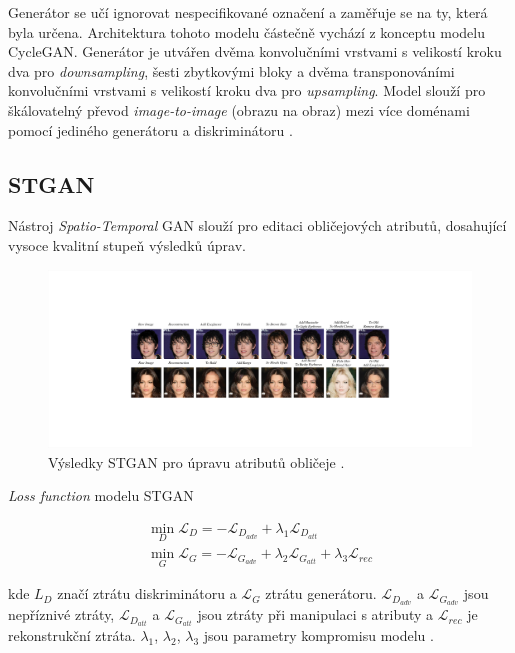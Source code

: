 \bigskip

\noindent Generátor se učí ignorovat nespecifikované označení a zaměřuje se na ty, která byla určena. Architektura tohoto modelu částečně vychází z konceptu modelu CycleGAN. Generátor je utvářen dvěma konvolučními vrstvami s velikostí kroku dva pro \textit{downsampling}, šesti zbytkovými bloky a dvěma transponováními konvolučními vrstvami s velikostí kroku dva pro \textit{upsampling}. Model slouží pro škálovatelný převod \textit{image-to-image} (obrazu na obraz) mezi více doménami pomocí jediného generátoru a diskriminátoru \cite{choi2018stargan}. 

\newpage

\subsection*{STGAN}

Nástroj \textit{Spatio-Temporal} GAN slouží pro editaci obličejových atributů, dosahující vysoce kvalitní stupeň výsledků úprav.

\begin{figure}[H]
	\centering
	\includegraphics[width=1\textwidth]{obrazky-figures/face_HD2_.pdf}
	\caption{Výsledky STGAN pro úpravu atributů obličeje \cite{liu2019stgan}.}
        \label{fig:stgan}
\end{figure}

\noindent \textit{Loss function} modelu STGAN

\begin{align}
    \min \limits _{D} \mathcal{L}_{D} =-\mathcal{L}_{D_{adv}} +\lambda _{1} \mathcal{L}_{D_{att}} \\
    \min \limits _{G} \mathcal{L}_{G} =-\mathcal{L}_{G_{adv}} +\lambda _{2} \mathcal{L}_{G_{att}} +\lambda _{3} \mathcal{L}_{rec}
    \label{eq:STGAN}
\end{align}

kde $L_D$ značí ztrátu diskriminátoru a $\mathcal{L}_G$ ztrátu generátoru. $\mathcal{L}_{D_{adv}}$ a $\mathcal{L}_{G_{adv}}$ jsou nepříznivé ztráty, $\mathcal{L}_{D_{att}}$ a $\mathcal{L}_{G_{att}}$ jsou ztráty při manipulaci s atributy a $\mathcal{L}_{rec}$ je rekonstrukční ztráta. $\lambda _{1}$, $\lambda _{2}$, $\lambda _{3}$ jsou parametry kompromisu modelu \cite{liu2019stgan}.

